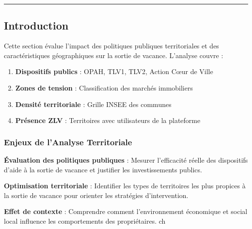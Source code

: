 \documentclass[11pt]{article}
\providecommand{\tightlist}{%
      \setlength{\itemsep}{0pt}\setlength{\parskip}{0pt}}
\begin{document}
\begin{center}\rule{0.5\linewidth}{0.5pt}\end{center}

\subsection{Introduction}\label{introduction}

Cette section évalue l'impact des politiques publiques territoriales et
des caractéristiques géographiques sur la sortie de vacance. L'analyse
couvre :

\begin{enumerate}
\def\labelenumi{\arabic{enumi}.}
\tightlist
\item
  \textbf{Dispositifs publics} : OPAH, TLV1, TLV2, Action Cœur de Ville
\item
  \textbf{Zones de tension} : Classification des marchés immobiliers
\item
  \textbf{Densité territoriale} : Grille INSEE des communes
\item
  \textbf{Présence ZLV} : Territoires avec utilisateurs de la plateforme
\end{enumerate}

\subsubsection{Enjeux de l'Analyse
Territoriale}\label{enjeux-de-lanalyse-territoriale}

\textbf{Évaluation des politiques publiques} : Mesurer l'efficacité
réelle des dispositifs d'aide à la sortie de vacance et justifier les
investissements publics.

\textbf{Optimisation territoriale} : Identifier les types de territoires
les plus propices à la sortie de vacance pour orienter les stratégies
d'intervention.

\textbf{Effet de contexte} : Comprendre comment l'environnement
économique et social local influence les comportements des
propriétaires. ch
\end{document}
